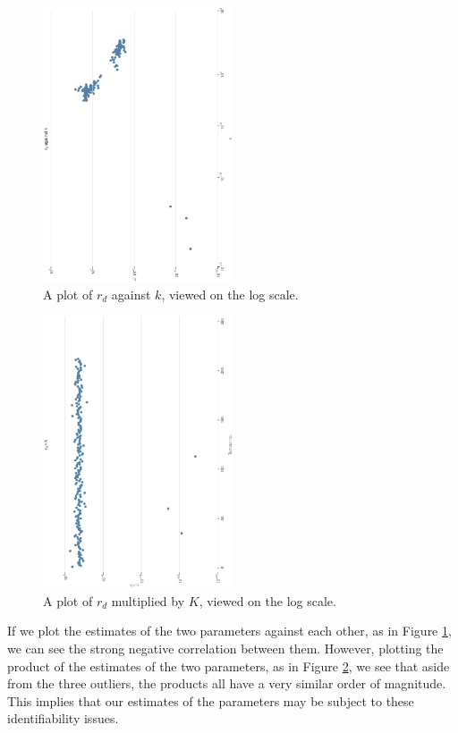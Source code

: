 \documentclass[11pt,a4paper]{article}
\begin{document}
\begin{figure}
\centering
\includegraphics[width=0.5\textwidth, angle=270]{rd_v_k.eps}
\caption{A plot of $r_d$ against $k$, viewed on the log scale.}
\label{fig:rd_v_k}
\end{figure}
\begin{figure}
\centering
\includegraphics[width=0.5\textwidth, angle=270]{rd_x_k.eps}
\caption{A plot of $r_d$ multiplied by $K$, viewed on the log scale.}
\label{fig:rd_x_k}
\end{figure}

If we plot the estimates of the two parameters against each other, as in Figure \ref{fig:rd_v_k}, we can see the strong negative correlation between them. However, plotting the product of the estimates of the two parameters, as in Figure \ref{fig:rd_x_k}, we see that aside from the three outliers, the products all have a very similar order of magnitude. This implies that our estimates of the parameters may be subject to these identifiability issues.
\end{document}
